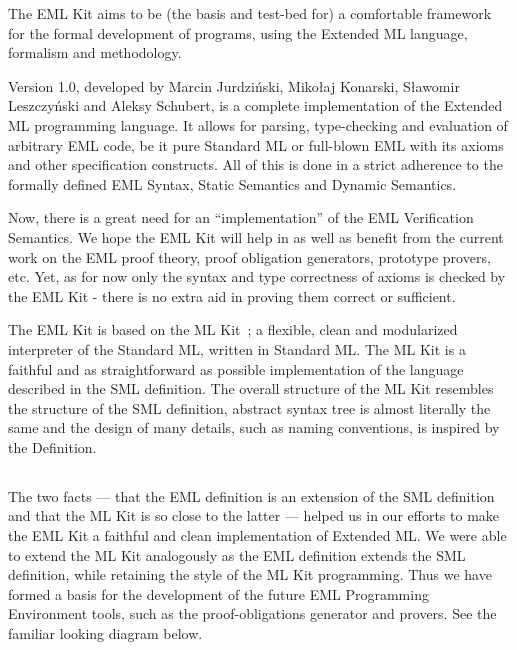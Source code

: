 {
The EML Kit \cite{JKS96} aims to be (the basis and test-bed for) a comfortable
framework for the formal development of programs, using the 
Extended ML language, formalism and methodology.

Version 1.0, developed by Marcin Jurdzi\'nski, Miko{\l}aj Konarski, 
S{\l}awomir Leszczy\'nski and Aleksy Schubert,
is a complete implementation of the Extended ML 
programming language. It allows for parsing, type-checking 
and evaluation of arbitrary EML code, be it pure 
Standard ML or full-blown EML with its axioms and other specification constructs. 
All of this is done in a strict adherence 
to the formally defined EML Syntax, Static Semantics and Dynamic Semantics.

Now, there is a great need for an ``implementation'' 
of the EML Verification Semantics. We hope the EML Kit will help in
as well as benefit from the current work on the EML proof theory,
proof obligation generators, prototype provers, etc.
Yet, as for now only the syntax and type correctness of 
axioms is checked by the EML Kit - there is no extra aid
in proving them correct or sufficient. 

The EML Kit is based on the ML Kit~\cite{BRTT93}; a flexible, clean and
modularized interpreter of the Standard ML, written in Standard ML.
The ML Kit is a faithful and as straightforward as possible 
implementation of the language described in the SML definition. The overall structure 
of the ML Kit resembles the structure of the SML definition,
abstract syntax tree is almost literally the same and
the design of many details, such as naming conventions,
is inspired by the Definition. 
}
{}

\subsection{\secdepend}
\label{sec:depend}

{
The two facts --- that the EML definition is an extension of 
the SML definition and that the ML Kit is so close to the latter --- 
helped us in our efforts to make the EML Kit a faithful and clean 
implementation of Extended ML. We were able to extend the ML Kit
analogously as the EML definition extends the SML definition,
while retaining the style of the ML Kit programming.
Thus we have formed a basis for the development of the future EML Programming
Environment tools, such as the proof-obligations generator and provers.
See the familiar looking diagram below.
}
{}


